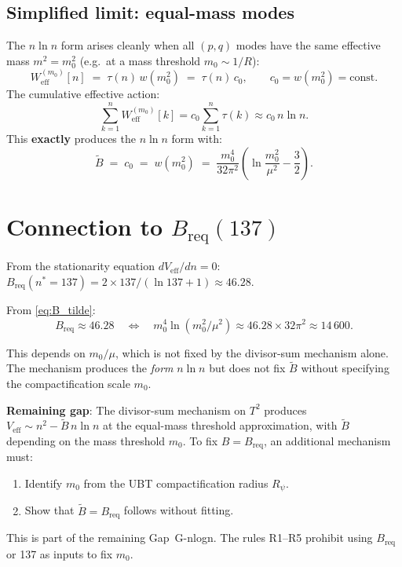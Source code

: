 \documentclass[12pt,a4paper]{article}
\theoremstyle{remark}
\begin{document}
\subsection{Simplified limit: equal-mass modes}

The $n\ln n$ form arises cleanly when all $(p,q)$ modes have the same effective
mass $m^2 = m_0^2$ (e.g.\ at a mass threshold $m_0 \sim 1/R$):
\begin{equation}
  W_{\mathrm{eff}}^{(m_0)}[n]
  \;=\; \tau(n)\,w(m_0^2)
  \;=\; \tau(n)\,c_0,
  \qquad c_0 = w(m_0^2) = \text{const}.
  \label{eq:W_flat}
\end{equation}
The cumulative effective action:
\begin{equation}
  \sum_{k=1}^{n} W_{\mathrm{eff}}^{(m_0)}[k]
  = c_0\sum_{k=1}^{n}\tau(k)
  \approx c_0\,n\ln n.
  \label{eq:nlogn_result}
\end{equation}
This \textbf{exactly} produces the $n\ln n$ form with:
\begin{equation}
  \tilde B \;=\; c_0 \;=\; w(m_0^2) \;=\; \frac{m_0^4}{32\pi^2}
  \left(\ln\frac{m_0^2}{\mu^2} - \frac{3}{2}\right).
  \label{eq:B_tilde}
\end{equation}

\section{Connection to $B_{\mathrm{req}}(137)$}
\label{sec:B_req}

From the stationarity equation $dV_\mathrm{eff}/dn = 0$:
$B_{\mathrm{req}}(n^*=137) = 2\times 137/(\ln 137 + 1) \approx 46.28$.

From \eqref{eq:B_tilde}:
\begin{equation}
  B_{\mathrm{req}} \approx 46.28
  \quad\Leftrightarrow\quad
  m_0^4\ln(m_0^2/\mu^2) \approx 46.28\times 32\pi^2 \approx 14\,600.
\end{equation}

This depends on $m_0/\mu$, which is not fixed by the divisor-sum mechanism
alone.  The mechanism produces the \emph{form} $n\ln n$ but does not
fix $\tilde B$ without specifying the compactification scale $m_0$.

\begin{gapbox}
\textbf{Remaining gap}: The divisor-sum mechanism on $T^2$ produces
$V_{\mathrm{eff}} \sim n^2 - \tilde B\,n\ln n$ at the equal-mass threshold
approximation, with $\tilde B$ depending on the mass threshold $m_0$.
To fix $B = B_{\mathrm{req}}$, an additional mechanism must:
\begin{enumerate}
  \item Identify $m_0$ from the UBT compactification radius $R_\psi$.
  \item Show that $\tilde B = B_{\mathrm{req}}$ follows without fitting.
\end{enumerate}
This is part of the remaining Gap~G-nlogn.  The rules R1--R5 prohibit
using $B_{\mathrm{req}}$ or 137 as inputs to fix $m_0$.
\end{gapbox}
\end{document}
